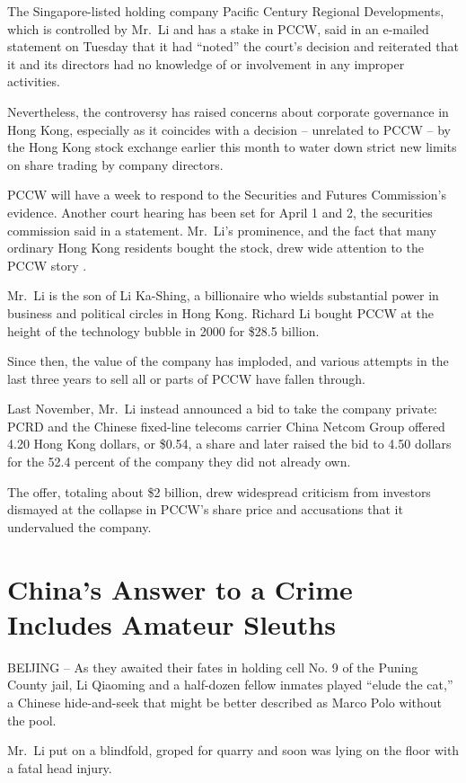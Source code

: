 \documentclass[12pt,a4paper,onecolumn]{article}
\begin{document}
\begin{CJK*}{GBK}{song}
The Singapore-listed holding company Pacific Century Regional Developments, which is controlled by
Mr.~Li and has a stake in PCCW, said in an e-mailed statement on Tuesday that it had ``noted'' the
court's decision and reiterated that it and its directors had no knowledge of or involvement in any
improper activities.

Nevertheless, the controversy has raised concerns about corporate governance in Hong Kong,
especially as it coincides with a decision -- unrelated to PCCW -- by the Hong Kong stock exchange
earlier this month to water down strict new limits on share trading by company directors.

PCCW will have a week to respond to the Securities and Futures Commission's evidence. Another court
hearing has been set for April 1 and 2, the securities commission said in a statement. Mr.~Li's
prominence, and the fact that many ordinary Hong Kong residents bought the stock, drew wide
attention to the PCCW story .

Mr.~Li is the son of Li Ka-Shing, a billionaire who wields substantial power in business and
political circles in Hong Kong. Richard Li bought PCCW at the height of the technology bubble in
2000 for \$28.5 billion.

Since then, the value of the company has imploded, and various attempts in the last three years to
sell all or parts of PCCW have fallen through.

Last November, Mr.~Li instead announced a bid to take the company private: PCRD and the Chinese
fixed-line telecoms carrier China Netcom Group offered 4.20 Hong Kong dollars, or \$0.54, a share
and later raised the bid to 4.50 dollars for the 52.4 percent of the company they did not already
own.

The offer, totaling about \$2 billion, drew widespread criticism from investors dismayed at the
collapse in PCCW's share price and accusations that it undervalued the company.


\section{China's Answer to a Crime Includes Amateur Sleuths}

BEIJING -- As they awaited their fates in holding cell No. 9 of the Puning County jail, Li Qiaoming
and a half-dozen fellow inmates played ``elude the cat,'' a Chinese hide-and-seek that might be
better described as Marco Polo without the pool.

Mr.~Li put on a blindfold, groped for quarry and soon was lying on the floor with a fatal head
injury.


\end{CJK*}
\end{document}
